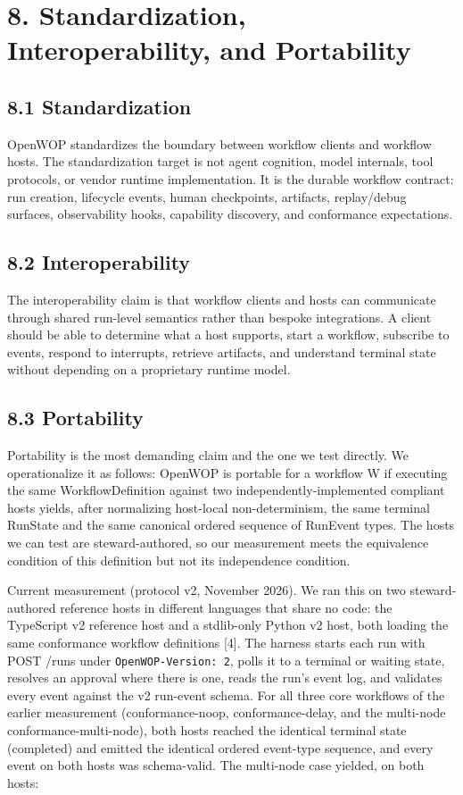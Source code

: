 \documentclass[11pt]{article}
\begin{document}
\section*{8. Standardization, Interoperability, and Portability}
\subsection*{8.1 Standardization}
OpenWOP standardizes the boundary between workflow clients and workflow hosts. The standardization target is not agent cognition, model internals, tool protocols, or vendor runtime implementation. It is the durable workflow contract: run creation, lifecycle events, human checkpoints, artifacts, replay/debug surfaces, observability hooks, capability discovery, and conformance expectations.

\subsection*{8.2 Interoperability}
The interoperability claim is that workflow clients and hosts can communicate through shared run-level semantics rather than bespoke integrations. A client should be able to determine what a host supports, start a workflow, subscribe to events, respond to interrupts, retrieve artifacts, and understand terminal state without depending on a proprietary runtime model.

\subsection*{8.3 Portability}
Portability is the most demanding claim and the one we test directly. We operationalize it as follows: OpenWOP is portable for a workflow W if executing the same WorkflowDefinition against two independently-implemented compliant hosts yields, after normalizing host-local non-determinism, the same terminal RunState and the same canonical ordered sequence of RunEvent types. The hosts we can test are steward-authored, so our measurement meets the equivalence condition of this definition but not its independence condition.

Current measurement (protocol v2, November 2026). We ran this on two steward-authored reference hosts in different languages that share no code: the TypeScript v2 reference host and a stdlib-only Python v2 host, both loading the same conformance workflow definitions [4]. The harness starts each run with POST /runs under \texttt{OpenWOP-Version: 2}, polls it to a terminal or waiting state, resolves an approval where there is one, reads the run's event log, and validates every event against the v2 run-event schema. For all three core workflows of the earlier measurement (conformance-noop, conformance-delay, and the multi-node conformance-multi-node), both hosts reached the identical terminal state (completed) and emitted the identical ordered event-type sequence, and every event on both hosts was schema-valid. The multi-node case yielded, on both hosts:
\end{document}
